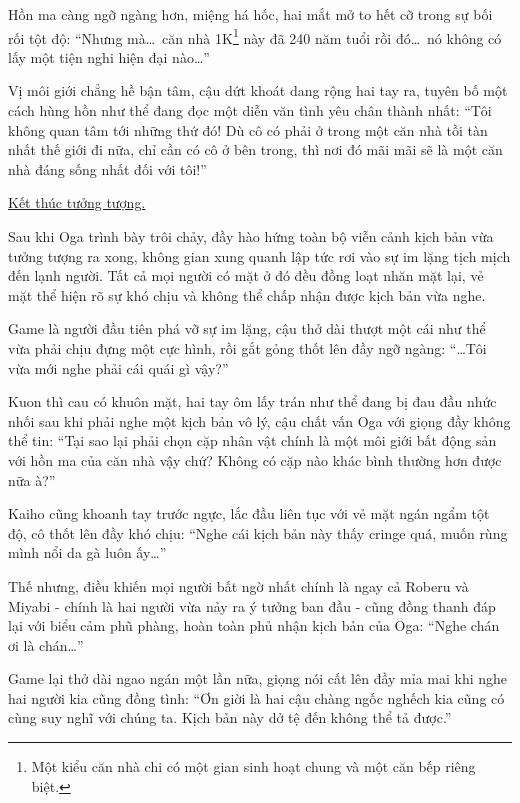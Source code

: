 \documentclass[../main.tex]{subfiles}
\begin{document}
Hồn ma càng ngỡ ngàng hơn, miệng há hốc, hai mắt mở to hết cỡ trong sự bối rối tột độ: ``Nhưng mà\dots\ căn nhà 1K\footnote{Một kiểu căn nhà chi có một gian sinh hoạt chung và một căn bếp riêng biệt.} này đã 240 năm tuổi rồi đó\dots\ nó không có lấy một tiện nghi hiện đại nào\dots''

Vị môi giới chẳng hề bận tâm, cậu dứt khoát dang rộng hai tay ra, tuyên bố một cách hùng hồn như thể đang đọc một diễn văn tình yêu chân thành nhất: ``Tôi không quan tâm tới những thứ đó! Dù cô có phải ở trong một căn nhà tồi tàn nhất thế giới đi nữa, chỉ cần có cô ở bên trong, thì nơi đó mãi mãi sẽ là một căn nhà đáng sống nhất đối với tôi!''

\begin{center}
  \uline{Kết thúc tưởng tượng.}
\end{center}

Sau khi Oga trình bày trôi chảy, đầy hào hứng toàn bộ viễn cảnh kịch bản vừa tưởng tượng ra xong, không gian xung quanh lập tức rơi vào sự im lặng tịch mịch đến lạnh người. Tất cả mọi người có mặt ở đó đều đồng loạt nhăn mặt lại, vẻ mặt thể hiện rõ sự khó chịu và không thể chấp nhận được kịch bản vừa nghe.


Game là người đầu tiên phá vỡ sự im lặng, cậu thở dài thượt một cái như thể vừa phải chịu đựng một cực hình, rồi gắt gỏng thốt lên đầy ngỡ ngàng: ``\dots Tôi vừa mới nghe phải cái quái gì vậy?''

Kuon thì cau có khuôn mặt, hai tay ôm lấy trán như thể đang bị đau đầu nhức nhối sau khi phải nghe một kịch bản vô lý, cậu chất vấn Oga với giọng đầy không thể tin: ``Tại sao lại phải chọn cặp nhân vật chính là một môi giới bất động sản với hồn ma của căn nhà vậy chứ? Không có cặp nào khác bình thường hơn được nữa à?''

Kaiho cũng khoanh tay trước ngực, lắc đầu liên tục với vẻ mặt ngán ngẩm tột độ, cô thốt lên đầy khó chịu: ``Nghe cái kịch bản này thấy cringe quá, muốn rùng mình nổi da gà luôn ấy\dots''

Thế nhưng, điều khiến mọi người bất ngờ nhất chính là ngay cả Roberu và Miyabi - chính là hai người vừa nảy ra ý tưởng ban đầu - cũng đồng thanh đáp lại với biểu cảm phũ phàng, hoàn toàn phủ nhận kịch bản của Oga: ``Nghe chán ơi là chán\dots''

Game lại thở dài ngao ngán một lần nữa, giọng nói cất lên đầy mỉa mai khi nghe hai người kia cũng đồng tình: ``Ơn giời là hai cậu chàng ngốc nghếch kia cũng có cùng suy nghĩ với chúng ta. Kịch bản này dở tệ đến không thể tả được.''
\end{document}
